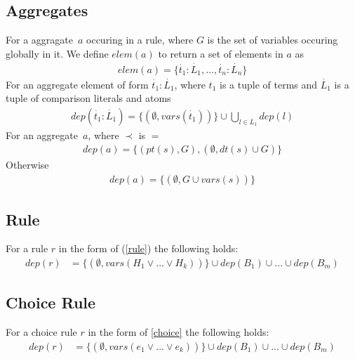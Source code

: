 \documentclass{article}
\newcommand{\tuple}[1]{\dot{#1}}
\newcommand{\set}[1]{\{#1\}}
\newcommand\Provide{\mathit{pt}}
\newcommand\Depend{\mathit{dt}}
\begin{document}
	\subsection{Aggregates}
	For a aggragate~$a$ occuring in a rule, where $G$ is the set of variables occuring globally in it.
	We define $elem(a)$ to return a set of elements in $a$ as
	\begin{align*}
		elem(a) = \set{\tuple{t_1} : \tuple{L_1}, \dots , \tuple{t_n} : \tuple{L_n}}
	\end{align*}
	For an aggregate element of form $\tuple{t_1} : \tuple{L_1}$, where $t_1$ is a tuple of terms and $\tuple{L_1}$ is a tuple of comparison literals and atoms
	\begin{align*}
		dep(\tuple{t_1} : \tuple{L_1}) = \set{(\emptyset, vars(\tuple{t_1}))} \cup \bigcup_{l \in \tuple{L_1}} dep(l)
	\end{align*}
	For an aggregate~$a$, where $\prec$ is $=$
	\begin{align*}
		dep(a) = \set{(\Provide(s), G), (\emptyset, \Depend(s) \cup G)}
	\end{align*}
	Otherwise
	\begin{align*}
		dep(a) = \set{(\emptyset, G \cup vars(s))}
	\end{align*}

	\subsection{Rule}
	For a rule $r$ in the form of (\ref{rule}) the following holds:
	\begin{align*}
		dep(r) &= \set{(\emptyset, vars(H_1\vee ... \vee H_k))} \cup dep(B_1) \cup ... \cup dep(B_m)
	\end{align*}

	\subsection{Choice Rule}
	For a choice rule $r$ in the form of \eqref{choice} the following holds:
	\begin{align*}
		dep(r) &= \set{(\emptyset, vars(e_1\vee ... \vee e_k))} \cup dep(B_1) \cup ... \cup dep(B_m)
	\end{align*}
\end{document}
